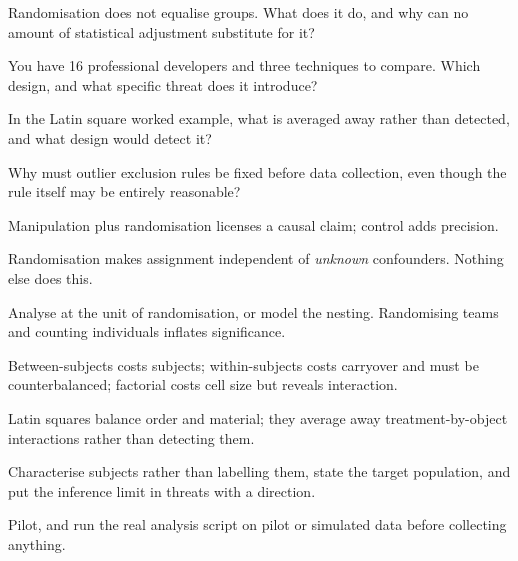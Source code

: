 \begin{checkpoint}
\begin{tightnum}
  \item Randomisation does not equalise groups. What does it do, and why can no
    amount of statistical adjustment substitute for it?
  \item You have 16 professional developers and three techniques to compare.
    Which design, and what specific threat does it introduce?
  \item In the Latin square worked example, what is averaged away rather than
    detected, and what design would detect it?
  \item Why must outlier exclusion rules be fixed before data collection, even
    though the rule itself may be entirely reasonable?
\end{tightnum}
\end{checkpoint}

\begin{chaptersummary}
\begin{tight}
  \item Manipulation plus randomisation licenses a causal claim; control adds
    precision.
  \item Randomisation makes assignment independent of \emph{unknown}
    confounders. Nothing else does this.
  \item Analyse at the unit of randomisation, or model the nesting. Randomising
    teams and counting individuals inflates significance.
  \item Between-subjects costs subjects; within-subjects costs carryover and
    must be counterbalanced; factorial costs cell size but reveals interaction.
  \item Latin squares balance order and material; they average away
    treatment-by-object interactions rather than detecting them.
  \item Characterise subjects rather than labelling them, state the target
    population, and put the inference limit in threats with a direction.
  \item Pilot, and run the real analysis script on pilot or simulated data
    before collecting anything.
\end{tight}
\end{chaptersummary}

